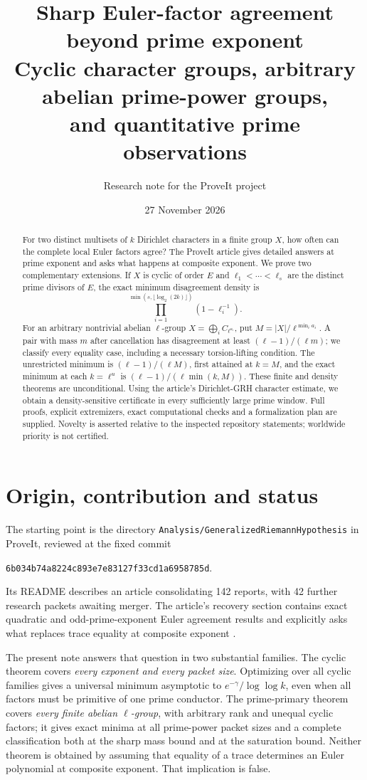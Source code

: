 \documentclass[11pt]{article}
\title{\textbf{Sharp Euler-factor agreement\\beyond prime exponent}\\[5pt]
\large Cyclic character groups, arbitrary abelian prime-power groups,\\and quantitative prime observations}
\author{Research note for the ProveIt project}
\date{27 November 2026}
\theoremstyle{definition}
\theoremstyle{remark}
\begin{document}
\maketitle
\begin{abstract}
For two distinct multisets of $k$ Dirichlet characters in a finite group $X$, how often can the complete local Euler factors agree? The ProveIt article gives detailed answers at prime exponent and asks what happens at composite exponent. We prove two complementary extensions. If $X$ is cyclic of order $E$ and $\ell_1<\cdots<\ell_s$ are the distinct prime divisors of $E$, the exact minimum disagreement density is
\[
 \prod_{i=1}^{\min(s,\lfloor\log_2(2k)\rfloor)}(1-\ell_i^{-1}).
\]
For an arbitrary nontrivial abelian $\ell$-group $X=\bigoplus_i C_{\ell^{a_i}}$, put $M=|X|/\ell^{\min_i a_i}$. A pair with mass $m$ after cancellation has disagreement at least $(\ell-1)/(\ell m)$; we classify every equality case, including a necessary torsion-lifting condition. The unrestricted minimum is $(\ell-1)/(\ell M)$, first attained at $k=M$, and the exact minimum at each $k=\ell^u$ is $(\ell-1)/(\ell\min(k,M))$. These finite and density theorems are unconditional. Using the article's Dirichlet-GRH character estimate, we obtain a density-sensitive certificate in every sufficiently large prime window. Full proofs, explicit extremizers, exact computational checks and a formalization plan are supplied. Novelty is asserted relative to the inspected repository statements; worldwide priority is not certified.
\end{abstract}
\tableofcontents

\section{Origin, contribution and status}
The starting point is the directory \texttt{Analysis/GeneralizedRiemannHypothesis} in ProveIt, reviewed at the fixed commit
\begin{center}\small\texttt{6b034b74a8224c893e7e83127f33cd1a6958785d}.\end{center}
Its README describes an article consolidating 142 reports, with 42 further research packets awaiting merger. The article's recovery section contains exact quadratic and odd-prime-exponent Euler agreement results and explicitly asks what replaces trace equality at composite exponent \cite{proveit,rec}.

The present note answers that question in two substantial families. The cyclic theorem covers \emph{every exponent and every packet size}. Optimizing over all cyclic families gives a universal minimum asymptotic to $e^{-\gamma}/\log\log k$, even when all factors must be primitive of one prime conductor. The prime-primary theorem covers \emph{every finite abelian $\ell$-group}, with arbitrary rank and unequal cyclic factors; it gives exact minima at all prime-power packet sizes and a complete classification both at the sharp mass bound and at the saturation bound. Neither theorem is obtained by assuming that equality of a trace determines an Euler polynomial at composite exponent. That implication is false.
\end{document}
